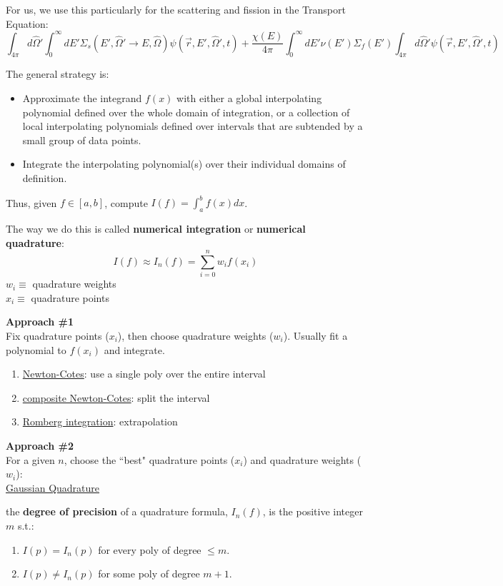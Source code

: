 \documentclass[12pt]{article}
\newcommand{\vOmega}{\ensuremath{\hat{\Omega}}}
\begin{document}
For us, we use this particularly for the scattering and fission in the Transport Equation:
\[\int_{4\pi} d\vOmega' \int_0^{\infty} dE' \Sigma_s(E', \vOmega' \rightarrow E, \vOmega) \psi(\vec{r}, E', \vOmega', t)  +
 \frac{\chi(E)}{4\pi} \int_0^{\infty} dE' \nu(E') \Sigma_f(E') \int_{4\pi} d\vOmega' \psi(\vec{r}, E', \vOmega', t) \]

The general strategy is:
\begin{itemize}
\item Approximate the integrand $f(x)$ with either a global interpolating
polynomial defined over the whole domain of integration, or a
collection of local interpolating polynomials defined over intervals
that are subtended by a small group of data points.
\item Integrate the interpolating polynomial(s) over their individual
domains of definition.
\end{itemize}

Thus, given $f \in[a,b]$, compute $I(f) = \int_a^b f(x) dx$.

The way we do this is called \textbf{numerical integration} or \textbf{numerical quadrature}:
\[I(f) \approx I_n(f) = \sum_{i=0}^n w_i f(x_i)\]
$w_i \equiv$ quadrature weights\\
$x_i \equiv$ quadrature points

\textbf{Approach \#1}\\
Fix quadrature points ($x_i$), then choose quadrature weights ($w_i$). Usually fit a polynomial to $f(x_i)$ and integrate.
%
\begin{enumerate}%
\item \underline{Newton-Cotes}: use a single poly over the entire interval
\item \underline{composite Newton-Cotes}: split the interval
\item \underline{Romberg integration}: extrapolation
\end{enumerate}

\textbf{Approach \#2}\\
For a given $n$, choose the ``best" quadrature points ($x_i$) and quadrature weights ($w_i$):\\
\underline{Gaussian Quadrature}

\vspace*{1em}
the \textbf{degree of precision} of a quadrature formula, $I_n(f)$, is the positive integer $m$ s.t.:
\begin{enumerate}
\item $I(p) = I_n(p)$ for every poly of degree $\leq m$.
\item $I(p) \neq I_n(p)$ for some poly of degree $m+1$.
\end{enumerate}
 
\end{document}
